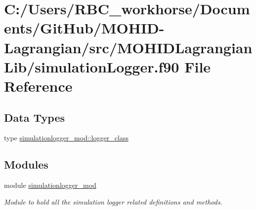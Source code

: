 \hypertarget{simulation_logger_8f90}{}\section{C\+:/\+Users/\+R\+B\+C\+\_\+workhorse/\+Documents/\+Git\+Hub/\+M\+O\+H\+I\+D-\/\+Lagrangian/src/\+M\+O\+H\+I\+D\+Lagrangian\+Lib/simulation\+Logger.f90 File Reference}
\label{simulation_logger_8f90}
\subsection*{Data Types}
\begin{DoxyCompactItemize}
\item 
type \mbox{\hyperlink{structsimulationlogger__mod_1_1logger__class}{simulationlogger\+\_\+mod\+::logger\+\_\+class}}
\end{DoxyCompactItemize}
\subsection*{Modules}
\begin{DoxyCompactItemize}
\item 
module \mbox{\hyperlink{namespacesimulationlogger__mod}{simulationlogger\+\_\+mod}}
\begin{DoxyCompactList}\small\item\em Module to hold all the simulation logger related definitions and methods. \end{DoxyCompactList}\end{DoxyCompactItemize}
